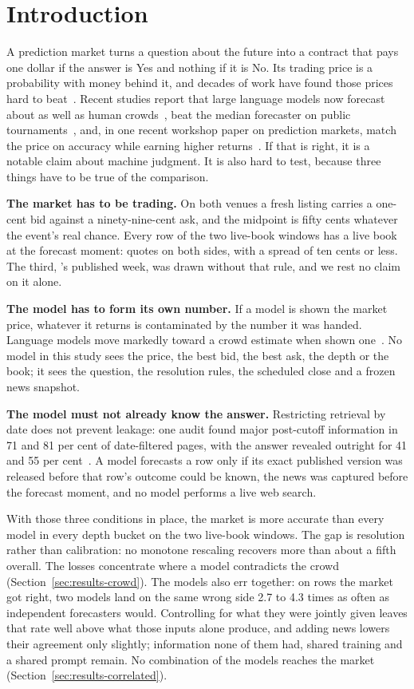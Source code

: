 \section{Introduction}
\label{sec:intro}

A prediction market turns a question about the future into a contract that pays
one dollar if the answer is Yes and nothing if it is No. Its trading price is a
probability with money behind it, and decades of work have found those prices
hard to beat~\citep{wolfers2004}. Recent studies report that large language
models now forecast about as well as human crowds~\citep{schoenegger2024}, beat
the median forecaster on public tournaments~\citep{lu2025}, and, in one
recent workshop paper on prediction markets, match the price on accuracy while
earning higher returns~\citep{henry2026beyond}. If that is right, it is a notable claim about
machine judgment. It is also hard to test, because three things have to be true
of the comparison.

\textbf{The market has to be trading.} On both venues a fresh listing carries a
one-cent bid against a ninety-nine-cent ask, and the midpoint is fifty cents whatever the event's real chance. Every row of the two live-book windows has a live book at the
forecast moment: quotes on both sides, with a spread of ten cents or less. The third, \polybench's published week, was drawn without that rule, and we rest
no claim on it alone.

\textbf{The model has to form its own number.} If a model is shown the market
price, whatever it returns is contaminated by the number it was handed. Language
models move markedly toward a crowd estimate when shown
one~\citep{schoenegger2024}. No model in this study sees the price, the best bid,
the best ask, the depth or the book; it sees the question, the resolution rules,
the scheduled close and a frozen news snapshot.

\textbf{The model must not already know the answer.} Restricting retrieval by date
does not prevent leakage: one audit found major post-cutoff information in 71
and 81 per cent of date-filtered pages, with the answer revealed outright for 41
and 55 per cent~\citep{ellahib2026}. A model forecasts a row only if its exact published
version was released before that row's outcome could be known, the news was
captured before the forecast moment, and no model performs a live web search.

With those three conditions in place, the market is more accurate than every
model in every depth bucket on the two live-book windows. The gap is resolution
rather than calibration: no monotone rescaling recovers more than about a fifth
overall. The losses concentrate where a model contradicts the crowd
(Section~\ref{sec:results-crowd}). The models also err together: on rows the
market got right, two models land on the same wrong side 2.7 to 4.3 times as
often as independent forecasters would. Controlling for what they were jointly
given leaves that rate well above what those inputs alone produce, and adding
news lowers their agreement only slightly; information none of them had, shared training and a shared prompt
remain. No combination of the models reaches the market
(Section~\ref{sec:results-correlated}).

